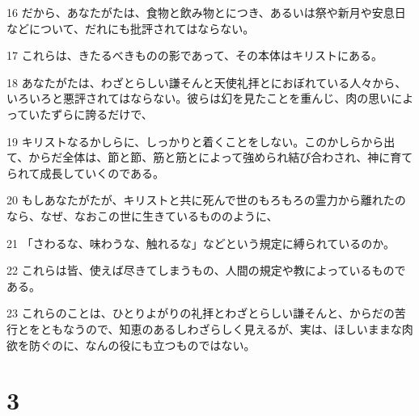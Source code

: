 \par 16 だから、あなたがたは、食物と飲み物とにつき、あるいは祭や新月や安息日などについて、だれにも批評されてはならない。
\par 17 これらは、きたるべきものの影であって、その本体はキリストにある。
\par 18 あなたがたは、わざとらしい謙そんと天使礼拝とにおぼれている人々から、いろいろと悪評されてはならない。彼らは幻を見たことを重んじ、肉の思いによっていたずらに誇るだけで、
\par 19 キリストなるかしらに、しっかりと着くことをしない。このかしらから出て、からだ全体は、節と節、筋と筋とによって強められ結び合わされ、神に育てられて成長していくのである。
\par 20 もしあなたがたが、キリストと共に死んで世のもろもろの霊力から離れたのなら、なぜ、なおこの世に生きているもののように、
\par 21 「さわるな、味わうな、触れるな」などという規定に縛られているのか。
\par 22 これらは皆、使えば尽きてしまうもの、人間の規定や教によっているものである。
\par 23 これらのことは、ひとりよがりの礼拝とわざとらしい謙そんと、からだの苦行とをともなうので、知恵のあるしわざらしく見えるが、実は、ほしいままな肉欲を防ぐのに、なんの役にも立つものではない。

\chapter{3}

